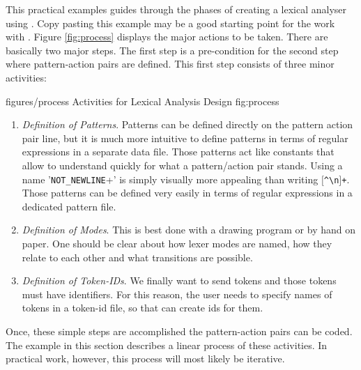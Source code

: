 This practical examples guides through the phases of creating a lexical
analyser using {\quex}. Copy pasting this example may be a good starting point
for the work with {\quex}. Figure \ref{fig:process} displays the major actions
to be taken. There are basically two major steps. The first step is a
pre-condition for the second step where pattern-action pairs are defined. This
first step consists of three minor activities:

\showpic
{figures/process}
{Activities for Lexical Analysis Design}
{fig:process}


\begin{enumerate}
\item {\it Definition of Patterns}. Patterns can be defined directly on the
  pattern action pair line, but it is much more intuitive to define patterns
  in terms of regular expressions \cite{} in a separate data file. Those
  patterns act like constants that allow to understand quickly for what a
  pattern/action pair stands. Using a name '{\tt NOT\_NEWLINE}+' is simply
  visually more appealing than writing {\tt $[$\verb|^\|n$]$+}. Those patterns
  can be defined very easily in terms of regular expressions in a dedicated
  pattern file.
  
\item {\it Definition of Modes}. This is best done with a drawing program or
  by hand on paper. One should be clear about how lexer modes are named, how
  they relate to each other and what transitions are possible.
  
\item {\it Definition of Token-IDs}. We finally want to send tokens and those
  tokens must have identifiers. For this reason, the user needs to specify
  names of tokens in a token-id file, so that {\quex} can create ids for them.
  
\end{enumerate}

Once, these simple steps are accomplished the pattern-action pairs can be
coded. The example in this section describes a linear process of these
activities. In practical work, however, this process will most likely be
iterative.


